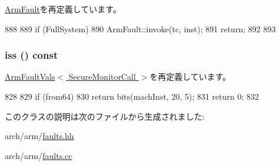\hyperlink{classArmISA_1_1ArmFault_a2bd783b42262278d41157d428e1f8d6f}{ArmFault}を再定義しています。


\begin{DoxyCode}
888 {
889     if (FullSystem) {
890         ArmFault::invoke(tc, inst);
891         return;
892     }
893 }
\end{DoxyCode}
\hypertarget{classArmISA_1_1SecureMonitorCall_a54f4d33ac162a95fd5b3830cf7fab8ff}{
\subsubsection[{iss}]{ iss () const}}
\label{classArmISA_1_1SecureMonitorCall_a54f4d33ac162a95fd5b3830cf7fab8ff}


\hyperlink{classArmISA_1_1ArmFaultVals_a1049bf31f8df10c66994603055cf531d}{ArmFaultVals$<$ SecureMonitorCall $>$}を再定義しています。


\begin{DoxyCode}
828 {
829     if (from64)
830         return bits(machInst, 20, 5);
831     return 0;
832 }
\end{DoxyCode}


このクラスの説明は次のファイルから生成されました:\begin{DoxyCompactItemize}
\item 
arch/arm/\hyperlink{arch_2arm_2faults_8hh}{faults.hh}\item 
arch/arm/\hyperlink{arch_2arm_2faults_8cc}{faults.cc}\end{DoxyCompactItemize}
